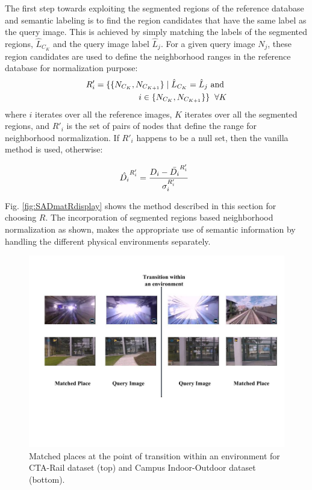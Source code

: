 \documentclass[letterpaper, 10 pt, conference]{ieeeconf}  %
\begin{document}
The first step towards exploiting the segmented regions of the reference database and semantic labeling is to find the region candidates that have the same label as the query image. This is achieved by simply matching the labels of the segmented regions, $\hat{L}_{C_K}$ and the query image label $\hat{L}_j$. For a given query image $N_j$, these region candidates are used to define the neighborhood ranges in the reference database for normalization purpose:
\begin{equation}
\begin{split}
 R'_i = \{\{N_{C_K},N_{C_{K+1}}\}\mid\hat{L}_{C_K}=\hat{L}_j \text{ and } \\
 i\in\{N_{C_K},N_{C_{K+1}}\} \} \hspace{0.2cm}\forall K
\end{split}
\end{equation}
where $i$ iterates over all the reference images, $K$ iterates over all the segmented regions, and $R'_i$ is the set of pairs of nodes that define the range for neighborhood normalization. If $R'_i$ happens to be a null set, then the vanilla method is used, otherwise:

\begin{equation}
 \hat{D_i}^{R'_i} = \frac{D_i-\bar{D_i}^{R'_i}}{\sigma_i^{R'_i}} \hspace{0.2cm}
 \label{eq:normScoreNew}
\end{equation}

Fig. \ref{fig:SADmatRdisplay} shows the method described in this section for choosing $R$. The incorporation of segmented regions based neighborhood normalization as shown, makes the appropriate use of semantic information by handling the different physical environments separately.

\begin{figure}
 \includegraphics[clip, trim=3cm 7cm 0cm 2cm,scale=0.28]{PlaceMatchesAtTransition}
 \caption{Matched places at the point of transition within an environment for CTA-Rail dataset (top) and Campus Indoor-Outdoor dataset (bottom).}
 \label{fig:placeMatches}
\end{figure}
\end{document}
